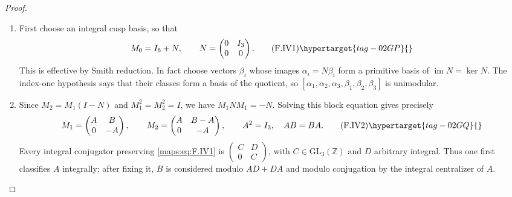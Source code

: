 \begin{proof}
\begin{enumerate}[label={$\langle1\rangle$\arabic*.}]
\item First choose an integral cusp basis, so that
\[
 M_0=I_6+N,\qquad N=\begin{pmatrix}0&I_3\\0&0\end{pmatrix}.
                                                               \tag{F.IV1}\hypertarget{tag-02GP}{}\label{maps:eq:F.IV1}
\]
This is effective by Smith reduction.  In fact choose vectors
$\beta_i$ whose images $\alpha_i=N\beta_i$ form a primitive
basis of $\operatorname{im}N=\ker N$.
The index-one hypothesis says that their classes form a basis
of the quotient, so $[\alpha_1,\alpha_2,\alpha_3,
\beta_1,\beta_2,\beta_3]$ is unimodular.

\item Since $M_2=M_1(I-N)$ and $M_1^2=M_2^2=I$, we have
$M_1NM_1=-N$.  Solving this block equation gives precisely
\[
 M_1=\begin{pmatrix}A&B\\0&-A\end{pmatrix},\qquad
 M_2=\begin{pmatrix}A&B-A\\0&-A\end{pmatrix},\qquad
 A^2=I_3,\quad AB=BA.                                     \tag{F.IV2}\hypertarget{tag-02GQ}{}\label{maps:eq:F.IV2}
\]
Every integral conjugator preserving \eqref{maps:eq:F.IV1} is
$\begin{pmatrix}C&D\\0&C\end{pmatrix}$, with
$C\in\mathrm{GL}_3(\mathbb Z)$ and $D$ arbitrary integral.
Thus one first classifies $A$ integrally; after fixing it,
$B$ is considered modulo $AD+DA$ and modulo conjugation by
the integral centralizer of $A$.


\end{enumerate}
\end{proof}

